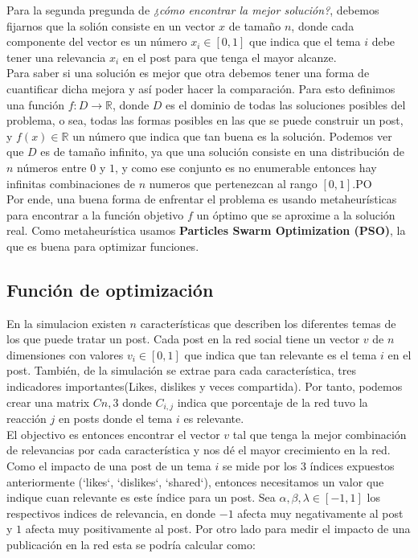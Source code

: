 \documentclass[12pt]{article}
\begin{document}
Para la segunda pregunda de \textit{¿cómo encontrar la mejor solución?}, debemos fijarnos que la solión consiste en un vector $x$ de tamaño $n$, donde cada componente del vector es un número $x_i \in [0,1]$ que
indica que el tema $i$ debe tener una relevancia $x_i$ en el post para que tenga el mayor alcanze.
\\
Para saber si una solución es mejor que otra debemos tener una forma de cuantificar dicha mejora y así poder hacer la comparación. Para esto definimos una función $f: D \rightarrow \mathbb{R}$, donde $D$ es
el dominio de todas las soluciones posibles del problema, o sea, todas las formas posibles en las que se puede construir un post, y $f(x) \in \mathbb{R}$ un número que indica que tan buena es la solución. 
Podemos ver que $D$ es de tamaño infinito, ya que una solución consiste en una distribución de $n$ números entre $0$ y $1$, y como ese conjunto es no enumerable entonces hay infinitas combinaciones de $n$ numeros
que pertenezcan al rango $[0, 1]$.PO
\\
Por ende, una buena forma de enfrentar el problema es usando metaheurísticas para encontrar a la función objetivo $f$ un óptimo que se aproxime a la solución real. Como metaheurística usamos \textbf{Particles Swarm Optimization (PSO)},
la que es buena para optimizar funciones. 


\subsection{Función de optimización}

En la simulacion existen $n$ características que describen los diferentes temas de los que puede tratar un post. Cada post en la red social tiene un vector $v$ de $n$ dimensiones con valores $v_i \in [0, 1]$ que indica que tan relevante es el tema $i$ en el post.
También, de la simulación se extrae para cada característica, tres indicadores importantes(Likes, dislikes y veces compartida). Por tanto, podemos crear una matrix $C{n,3}$ donde $C_{i,j}$ indica que porcentaje de la red tuvo la reacción $j$ en posts donde el tema $i$ es relevante.
\\
El objectivo es entonces encontrar el vector $v$ tal que tenga la mejor combinación de relevancias por cada característica y nos dé el mayor crecimiento en la red. Como el impacto de una post de un tema $i$ se mide por los 3 índices expuestos anteriormente (`likes`, `dislikes`, `shared`), 
entonces necesitamos un valor que indique cuan relevante es este índice para un post. Sea $\alpha, \beta, \lambda \in [-1, 1]$ los respectivos indices de relevancia, en donde $-1$ afecta muy negativamente al post y $1$ afecta muy positivamente al post.
Por otro lado para medir el impacto de una publicación en la red esta se podría calcular como:
\end{document}
